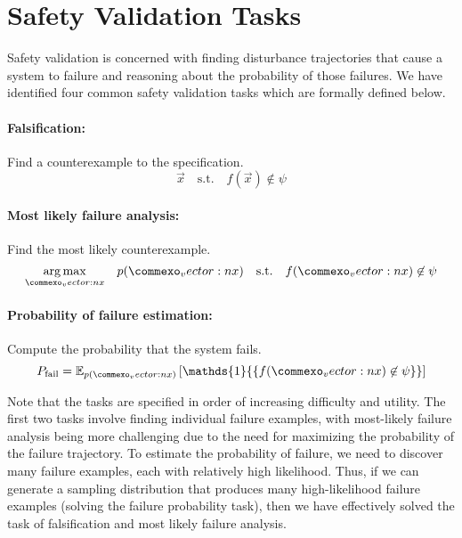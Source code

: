 \section{Safety Validation Tasks}

Safety validation is concerned with finding disturbance trajectories that cause a system to failure and reasoning about the probability of those failures. We have identified four common safety validation tasks which are formally defined below.

\paragraph{Falsification:} Find a counterexample to the specification. 
\begin{equation} 
\vec{x} \quad \text{s.t.} \quad f(\vec{x}) \not \in \psi
\end{equation}

\paragraph{Most likely failure analysis:} Find the most likely counterexample.
\begin{equation}
\underset{\vec{x}}{\argmax} \quad p(\vec{x}) \quad \text{s.t.} \quad f(\vec{x}) \not \in \psi
\end{equation}

\paragraph{Probability of failure estimation:} Compute the probability that the system fails.
\begin{equation}
P_{\rm fail} = \mathbb{E}_{p(\vec{x})}\left[ \mathds{1}{\{ f(\vec{x}) \not \in \psi \}} \right]
\end{equation}


Note that the tasks are specified in order of increasing difficulty and utility. The first two tasks involve finding individual failure examples, with most-likely failure analysis being more challenging due to the need for maximizing the probability of the failure trajectory. To estimate the probability of failure, we need to discover many failure examples, each with relatively high likelihood. Thus, if we can generate a sampling distribution that produces many high-likelihood failure examples (solving the failure probability task), then we have effectively solved the task of falsification and most likely failure analysis.  

